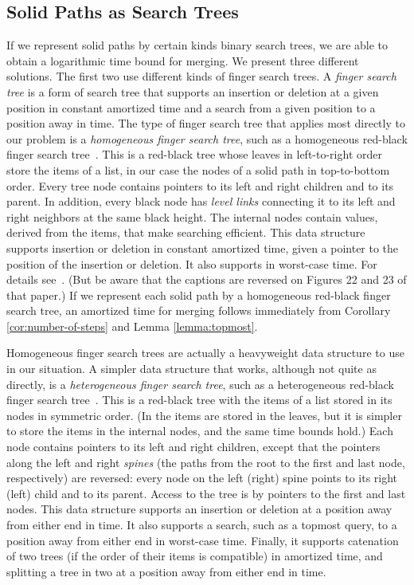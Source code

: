 \documentclass[twoside,leqno,twocolumn]{article}
\begin{document}
\subsection{Solid Paths as Search Trees}
\label{sec:merge-representation}

If we represent solid paths by certain kinds binary search trees, we are able to obtain a logarithmic time bound for merging.  We present three different solutions.  The first two use different kinds of finger search trees.  A \emph{finger search tree} is a form of search tree that supports an insertion or deletion at a given position in constant amortized time and a search from a given position to a position  away in  time.  The type of finger search tree that applies most directly to our problem is a \emph{homogeneous finger search tree}, such as a homogeneous red-black finger search tree~\cite{finger_trees:tvw88}.  This is a red-black tree whose leaves in left-to-right order store the items of a list, in our case the nodes of a solid path in top-to-bottom order.  Every tree node contains pointers to its left and right children and to its parent.  In addition, every black node has \emph{level links} connecting it to its left and right neighbors at the same black height.  The internal nodes contain values, derived from the items, that make searching efficient.  This data structure supports insertion or deletion in constant amortized time, given a pointer to the position of the insertion or deletion.  It also supports  in  worst-case time.  For details see~\cite{finger_trees:tvw88}.  (But be aware that the captions are reversed on Figures 22 and 23 of that paper.)  If  we represent each solid path by a homogeneous red-black finger search tree, an  amortized time for merging follows immediately from Corollary \ref{cor:number-of-steps} and Lemma \ref{lemma:topmost}.

Homogeneous finger search trees are actually a heavyweight data structure to use in our situation.  A simpler data structure that works, although not quite as directly, is a \emph{heterogeneous finger search tree}, such as a heterogeneous red-black finger search tree~\cite{finger_trees:tvw88}.  This is a red-black tree with the items of a list stored in its nodes in symmetric order.  (In \cite{finger_trees:tvw88} the items are stored in the leaves, but it is simpler to store the items in the internal nodes, and the same time bounds hold.)  Each node contains pointers to its left and right children, except that the pointers along the left and right \emph{spines} (the paths from the root to the first and last node, respectively) are reversed: every node on the left (right) spine points to its right (left) child and to its parent.  Access to the tree is by pointers to the first and last nodes.  This data structure supports an insertion or deletion at a position  away from either end in  time.  It also supports a search, such as a topmost query, to a position  away from either end in  worst-case time.  Finally, it supports catenation of two trees (if the order of their items is compatible) in  amortized time, and splitting a tree in two at a position  away from either end in  time.
\end{document}
